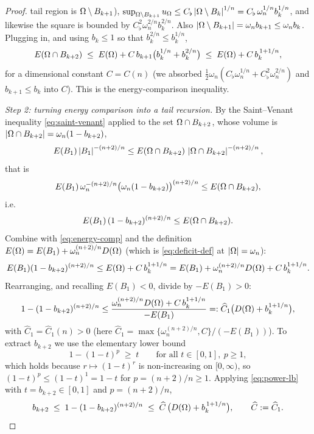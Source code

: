 \begin{proof}
tail region is $\Omega\setminus B_{k+1}$),
$\sup_{\Omega\setminus B_{k+1}}u_\Omega\le C_\flat\left|\Omega\setminus B_k\right|^{1/n}
=C_\flat\,\omega_n^{1/n}b_k^{1/n}$, and likewise the square is bounded by
$C_\flat^2\omega_n^{2/n}b_k^{2/n}$. Also
$\left|\Omega\setminus B_{k+1}\right|=\omega_n b_{k+1}\le\omega_n b_k$. Plugging in,
and using $b_k\le1$ so that $b_k^{2/n}\le b_k^{1/n}$,
\begin{equation}\label{eq:energy-comp}
   E(\Omega\cap B_{k+2})\;\le\;E(\Omega)+C\,b_{k+1}\bigl(b_k^{1/n}+b_k^{2/n}\bigr)
   \;\le\;E(\Omega)+C\,b_k^{\,1+1/n},
\end{equation}
for a dimensional constant $C=C(n)$ (we absorbed
$\tfrac12\omega_n(C_\flat\omega_n^{1/n}+C_\flat^2\omega_n^{2/n})$ and
$b_{k+1}\le b_k$ into $C$). This is the energy-comparison inequality.

\smallskip
\emph{Step 2: turning energy comparison into a tail recursion.}
By the Saint--Venant inequality \eqref{eq:saint-venant} applied to the
set $\Omega\cap B_{k+2}$, whose volume is
$\left|\Omega\cap B_{k+2}\right|=\omega_n(1-b_{k+2})$,
\[
   E(B_1)\left|B_1\right|^{-(n+2)/n}
   \le E(\Omega\cap B_{k+2})\,\left|\Omega\cap B_{k+2}\right|^{-(n+2)/n},
\]
that is
\[
   E(B_1)\,\omega_n^{-(n+2)/n}\bigl(\omega_n(1-b_{k+2})\bigr)^{(n+2)/n}
   \le E(\Omega\cap B_{k+2}),
\]
i.e.
\[
   E(B_1)\,(1-b_{k+2})^{(n+2)/n}\le E(\Omega\cap B_{k+2}).
\]
Combine with \eqref{eq:energy-comp} and the definition
$E(\Omega)=E(B_1)+\omega_n^{(n+2)/n}D(\Omega)$ (which is
\eqref{eq:deficit-def} at $\left|\Omega\right|=\omega_n$):
\[
   E(B_1)(1-b_{k+2})^{(n+2)/n}
   \le E(\Omega)+C\,b_k^{1+1/n}
   = E(B_1)+\omega_n^{(n+2)/n}D(\Omega)+C\,b_k^{1+1/n}.
\]
Rearranging, and recalling $E(B_1)<0$, divide by $-E(B_1)>0$:
\[
   1-(1-b_{k+2})^{(n+2)/n}
   \le\frac{\omega_n^{(n+2)/n}D(\Omega)+C\,b_k^{1+1/n}}{-E(B_1)}
   =:\widehat C_1\bigl(D(\Omega)+b_k^{1+1/n}\bigr),
\]
with $\widehat C_1=\widehat C_1(n)>0$
(here $\widehat C_1=\max\{\omega_n^{(n+2)/n},C\}/(-E(B_1))$). To extract
$b_{k+2}$ we use the elementary lower bound
\begin{equation}\label{eq:power-lb}
   1-(1-t)^{p}\;\ge\;t\qquad\text{for all }t\in[0,1],\ p\ge1,
\end{equation}
which holds because $r\mapsto(1-t)^{r}$ is non-increasing on $[0,\infty)$,
so $(1-t)^{p}\le(1-t)^{1}=1-t$ for $p=(n+2)/n\ge1$. Applying
\eqref{eq:power-lb} with $t=b_{k+2}\in[0,1]$ and $p=(n+2)/n$,
\begin{equation}\label{eq:bk2-bound}
   b_{k+2}\;\le\;1-(1-b_{k+2})^{(n+2)/n}
   \;\le\;\widehat C\,\bigl(D(\Omega)+b_k^{\,1+1/n}\bigr),
   \qquad \widehat C:=\widehat C_1 .
\end{equation}


\end{proof}
